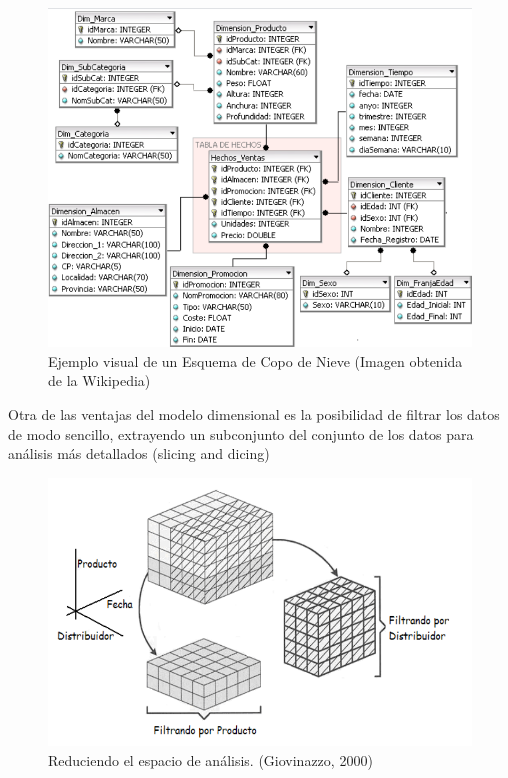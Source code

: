 \begin{figure}[ht]
  \begin{center}
    \includegraphics[scale=0.35]{Graphics/figura1_2.png}
    \caption{Ejemplo visual de un Esquema de Copo de Nieve (Imagen obtenida de la Wikipedia)}
    \label{fig:estrella}
  \end{center}
\end{figure}

Otra de las ventajas del modelo dimensional es la posibilidad de filtrar los datos de modo sencillo, extrayendo un subconjunto del conjunto de los datos para análisis más detallados (slicing and dicing)\\


\begin{figure}[ht]
  \begin{center}
    \includegraphics[scale=0.4]{Graphics/figura1_3.png}
    \caption{Reduciendo el espacio de análisis. (Giovinazzo, 2000)}
    \label{fig:cubo}
  \end{center}
\end{figure}

